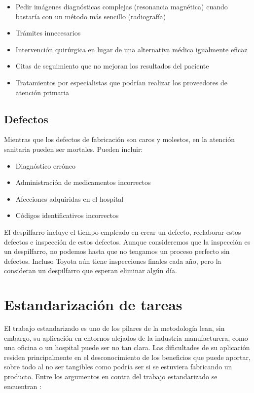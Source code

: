 \begin{itemize}
    \item Pedir imágenes diagnósticas complejas (resonancia magnética) cuando bastaría con un método más sencillo (radiografía)
    \item Trámites innecesarios
    \item Intervención quirúrgica en lugar de una alternativa médica igualmente eficaz
    \item Citas de seguimiento que no mejoran los resultados del paciente
    \item Tratamientos por especialistas que podrían realizar los proveedores de atención primaria
\end{itemize}

\subsection{Defectos}

Mientras que los defectos de fabricación son caros y molestos, en la atención sanitaria pueden ser mortales.
Pueden incluir:

\begin{itemize}
    \item Diagnóstico erróneo
    \item Administración de medicamentos incorrectos
    \item Afecciones adquiridas en el hospital
    \item Códigos identificativos incorrectos
\end{itemize}

El despilfarro incluye el tiempo empleado en crear un defecto, reelaborar estos defectos e inspección de estos defectos.
Aunque consideremos que la inspección es un despilfarro, no podemos hasta que no tengamos un proceso perfecto sin defectos.
Incluso Toyota aún tiene inspecciones finales cada año, pero la consideran un despilfarro que esperan eliminar algún día.

\section{Estandarización de tareas}

El trabajo estandarizado es uno de los pilares de la metodología lean, sin embargo, su aplicación en entornos alejados de la industria manufacturera, como una oficina o un hospital puede ser no tan clara.
Las dificultades de su aplicación residen principalmente en el desconocimiento de los beneficios que puede aportar, sobre todo al no ser tangibles como podría ser si se estuviera fabricando un producto.
Entre los argumentos en contra del trabajo estandarizado se encuentran \cite{locher_lean_2017}:

